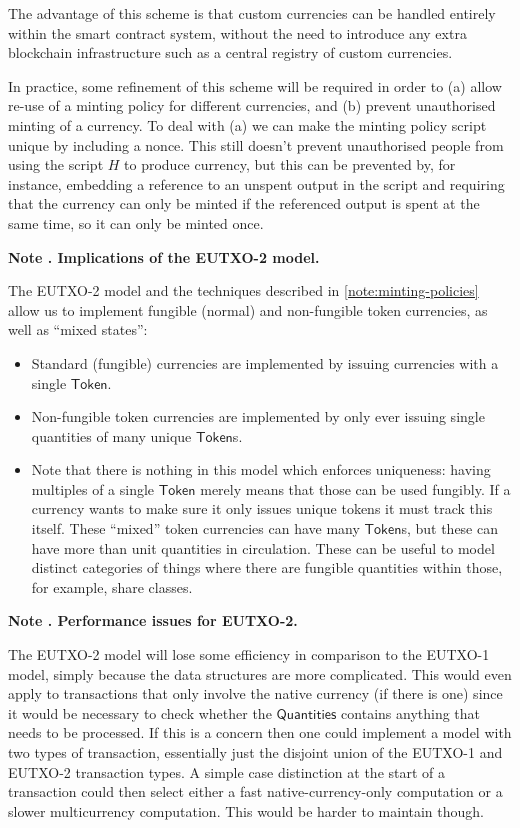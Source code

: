 \documentclass[a4paper]{article}
\newcounter{note}
\newcommand{\note}[1]{
  \bigskip
  \refstepcounter{note}
  \noindent\textbf{Note \thenote. #1}
}
\newcommand{\s}{\textsf}  %
\newcommand{\token}{\ensuremath{\s{Token}}}
\newcommand{\qtymap}{\ensuremath{\s{Quantities}}}
\begin{document}
The advantage of this scheme is that custom currencies can be handled
entirely within the smart contract system, without the need to
introduce any extra blockchain infrastructure such as a central
registry of custom currencies.

In practice, some refinement of this scheme will be required in order
to (a) allow re-use of a minting policy for different currencies, and
(b) prevent unauthorised minting of a currency. To deal with (a) we
can make the minting policy script unique by including a nonce. This
still doesn't prevent unauthorised people from using the script $H$ to
produce currency, but this can be prevented by, for instance,
embedding a reference to an unspent output in the script and requiring
that the currency can only be minted if the referenced output is spent
at the same time, so it can only be minted once.

\note{Implications of the EUTXO-2 model.}
\label{note:eutxo-2-implications}
The EUTXO-2 model and the techniques described in
\cref{note:minting-policies} allow us to implement fungible
(normal) and non-fungible token currencies, as well as ``mixed
states'':
\begin{itemize}
\item Standard (fungible) currencies are implemented by issuing
  currencies with a single \token{}.
\item Non-fungible token currencies are implemented by only ever
  issuing single quantities of many unique \token{}s.
\item Note that there is nothing in this model which enforces
  uniqueness: having multiples of a single \token{} merely means that
  those can be used fungibly. If a currency wants to make sure it only
  issues unique tokens it must track this itself.  These ``mixed'' token
  currencies can have many \token{}s, but these can have more than unit
  quantities in circulation.  These can be useful to model distinct
  categories of things where there are fungible quantities within
  those, for example, share classes.
\end{itemize}

\note{Performance issues for EUTXO-2.}
\label{note:eutxo-2-performance}
The EUTXO-2 model will lose some efficiency in comparison to the EUTXO-1
model, simply because the data structures are more complicated.  This
would even apply to transactions that only involve the native
currency (if there is one) since it would be necessary to check whether the \qtymap{}
contains anything that needs to be processed.  If this is a concern
then one could implement a model with two types of transaction,
essentially just the disjoint union of the EUTXO-1 and EUTXO-2
transaction types. A simple case distinction at the start of a
transaction could then select either a fast native-currency-only
computation or a slower multicurrency computation.  This would be
harder to maintain though.
\end{document}
